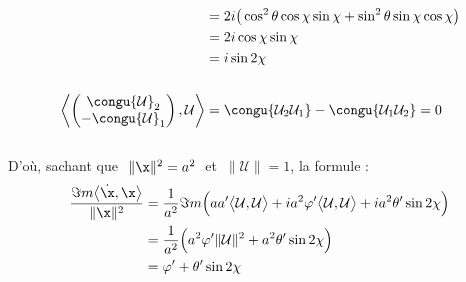 \begin{annexe}
\begin{demo}
\begin{align*}
		&= 2i\big(\cos^2\theta \cos\chi \sin\chi + \sin^2\theta \sin\chi \cos\chi \big) \\
		&= 2i \cos\chi \sin\chi \\
		&= i\sin2\chi 
		\\ \\
		\left\langle \begin{pmatrix} \congu{\mathcal{U}}_2 \\ -\congu{\mathcal{U}}_1 \end{pmatrix}, \mathcal{U} \right\rangle &= \congu{\mathcal{U}_2\mathcal{U}_1} - \congu{\mathcal{U}_1\mathcal{U}_2} = 0
	\end{align*}
	\\
	D'où, sachant que $\ \|\x\|^2=a^2\ $ et $\ \|\mathcal{U}\|=1$, la formule :
	\begin{align*}
		\frac{\Im m\big\langle \dot{\x}, \x\big\rangle}{\|\x\|^2} &= \frac{1}{a^2}\Im m\Big(aa' \big\langle \mathcal{U}, \mathcal{U}\big\rangle  + ia^2\varphi' \big\langle \mathcal{U}, \mathcal{U}\big\rangle + ia^2\theta' \sin2\chi \Big) \\
		&= \frac{1}{a^2} \Big( a^2\varphi' \|\mathcal{U}\|^2 + a^2\theta' \sin2\chi \Big) \\
		&= \varphi' + \theta' \sin2\chi
	\end{align*}
\end{demo}


\end{annexe}
